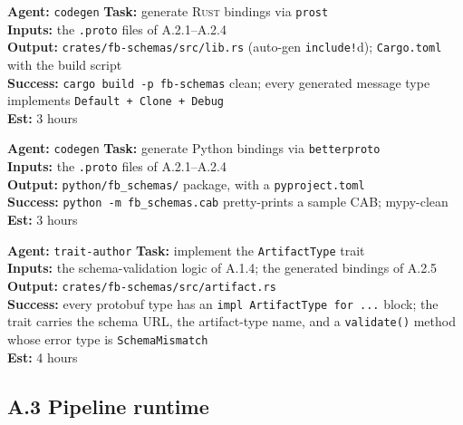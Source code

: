 \documentclass[12pt]{article}
\theoremstyle{definition}
\theoremstyle{remark}
\newcommand{\rust}{\textnormal{\textsc{Rust}}}
\newenvironment{tasklist}{%
  \begingroup\raggedright
  \begin{description}[style=nextline, leftmargin=1.4cm, itemsep=0.4em]
}{%
  \end{description}
  \endgroup
}
\begin{document}
\begin{tasklist}
\item[\textbf{Task A.2.5}] \textbf{Agent:} \texttt{codegen} \quad
  \textbf{Task:} generate \rust{} bindings via \texttt{prost}\\
  \textbf{Inputs:} the \texttt{.proto} files of A.2.1--A.2.4\\
  \textbf{Output:} \texttt{crates/fb-schemas/src/lib.rs} (auto-gen
  \texttt{include!}{}d); \texttt{Cargo.toml} with the build script\\
  \textbf{Success:} \texttt{cargo build -p fb-schemas} clean; every
  generated message type implements \texttt{Default + Clone + Debug}\\
  \textbf{Est:} 3 hours

\item[\textbf{Task A.2.6}] \textbf{Agent:} \texttt{codegen} \quad
  \textbf{Task:} generate Python bindings via \texttt{betterproto}\\
  \textbf{Inputs:} the \texttt{.proto} files of A.2.1--A.2.4\\
  \textbf{Output:} \texttt{python/fb\_schemas/} package, with a
  \texttt{pyproject.toml}\\
  \textbf{Success:} \texttt{python -m fb\_schemas.cab} pretty-prints a
  sample CAB; mypy-clean\\
  \textbf{Est:} 3 hours

\item[\textbf{Task A.2.7}] \textbf{Agent:} \texttt{trait-author} \quad
  \textbf{Task:} implement the \texttt{ArtifactType} trait\\
  \textbf{Inputs:} the schema-validation logic of A.1.4; the generated
  bindings of A.2.5\\
  \textbf{Output:} \texttt{crates/fb-schemas/src/artifact.rs}\\
  \textbf{Success:} every protobuf type has an
  \texttt{impl ArtifactType for ...} block; the trait carries the
  schema URL, the artifact-type name, and a \texttt{validate()} method
  whose error type is \texttt{SchemaMismatch}\\
  \textbf{Est:} 4 hours
\end{tasklist}

\subsection*{A.3 Pipeline runtime}
\end{document}
